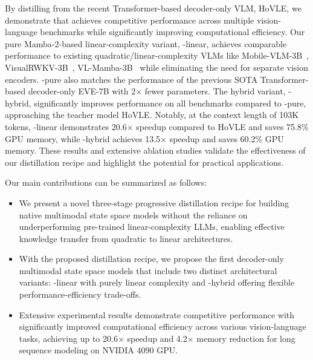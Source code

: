 By distilling from the recent Transformer-based decoder-only VLM, HoVLE, we demonstrate that \name{} achieves competitive performance across multiple vision-language benchmarks while significantly improving computational efficiency. Our pure Mamba-2-based linear-complexity variant, \name{}-linear, achieves comparable performance to existing quadratic/linear-complexity VLMs like Mobile-VLM-3B~\cite{mobilevlm}, VisualRWKV-3B~\cite{visualrwkv}, VL-Mamba-3B~\cite{vlmamba}
while eliminating the need for separate vision encoders. \name{}-pure also matches the performance of the previous SOTA Transformer-based decoder-only EVE-7B with 2$\times$ fewer parameters. The hybrid variant, \name-hybrid, significantly improves performance on all benchmarks compared to \name{}-pure, approaching the teacher model HoVLE. Notably, at the context length of 103K tokens, \name{}-linear demonstrates 20.6$\times$ speedup compared to HoVLE and saves 75.8\% GPU memory, while \name{}-hybrid achieves 13.5$\times$ speedup and saves 60.2\% GPU memory. These results and extensive ablation studies validate the effectiveness of our distillation recipe and highlight the potential for practical applications.

Our main contributions can be summarized as follows:
\begin{itemize}
\item We present a novel three-stage progressive distillation recipe for building native multimodal state space models without the reliance on underperforming pre-trained linear-complexity LLMs, enabling effective knowledge transfer from quadratic to linear architectures.
\item With the proposed distillation recipe, we propose the first decoder-only multimodal state space models that include two distinct architectural variants: \name{}-linear with purely linear complexity and \name{}-hybrid offering flexible performance-efficiency trade-offs.
\item Extensive experimental results demonstrate competitive performance with significantly improved computational efficiency across various vision-language tasks, achieving up to 20.6$\times$ speedup and 4.2$\times$ memory reduction for long sequence modeling on NVIDIA 4090 GPU.
\end{itemize}







